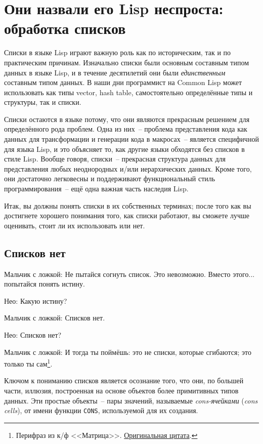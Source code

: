 \chapter{Они назвали его Lisp неспроста: обработка списков}
\label{ch:12}

\thispagestyle{empty}

Списки в языке Lisp играют важную роль как по историческим, так и по практическим
причинам. Изначально списки были основным составным типом данных в языке Lisp, и в течение
десятилетий они были \textit{единственным} составным типом данных. В наши дни программист на
Common Lisp может использовать как типы vector, hash table, самостоятельно определённые
типы и структуры, так и списки.

Списки остаются в языке потому, что они являются прекрасным решением для определённого
рода проблем. Одна из них~-- проблема представления кода как данных для трансформации и
генерации кода в макросах~-- является специфичной для языка Lisp, и это объясняет то, как
другие языки обходятся без списков в стиле Lisp. Вообще говоря, списки~-- прекрасная
структура данных для представления любых неоднородных и/или иерархических данных. Кроме
того, они достаточно легковесны и поддерживают функциональный стиль программирования~-- ещё
одна важная часть наследия Lisp.

Итак, вы должны понять списки в их собственных терминах; после того как вы достигнете
хорошего понимания того, как списки работают, вы сможете лучше оценивать, стоит ли их
использовать или нет.

\section{Списков нет}

Мальчик с ложкой: Не пытайся согнуть список. Это невозможно. Вместо этого... попытайся
понять истину.

Нео: Какую истину?

Мальчик с ложкой: Списков нет.

Нео: Списков нет?

Мальчик с ложкой: И тогда ты поймёшь: это не списки, которые сгибаются; это только ты
сам\footnote{Перифраз из к/ф <<Матрица>>.
  \href{http://us.imdb.com/Quotes?0133093}{Оригинальная цитата}.}.

Ключом к пониманию списков является осознание того, что они, по большей части, иллюзия,
построенная на основе объектов более примитивных типов данных. Эти простые объекты~-- пары
значений, называемые \textit{cons-ячейками} (\textit{cons cells}), от имени функции
\lstinline{CONS}, используемой для их создания.

